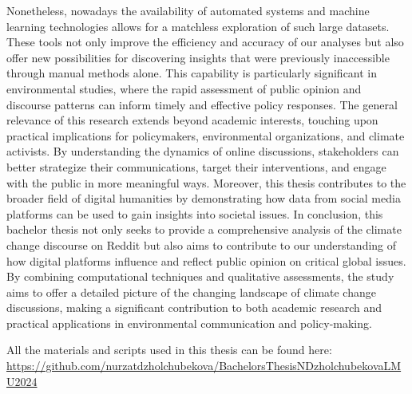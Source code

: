 Nonetheless, nowadays the availability of automated systems and machine learning technologies allows for a 
matchless exploration of such large datasets. These tools not only improve the efficiency and 
accuracy of our analyses but also offer new possibilities for discovering insights that were previously 
inaccessible through manual methods alone. This capability is particularly significant in environmental 
studies, where the rapid assessment of public opinion and discourse patterns can inform timely and 
effective policy responses.
The general relevance of this research extends beyond academic interests, touching upon practical 
implications for policymakers, environmental organizations, and climate activists. By understanding 
the dynamics of online discussions, stakeholders can better strategize their communications, target 
their interventions, and engage with the public in more meaningful ways. Moreover, this thesis 
contributes to the broader field of digital humanities by demonstrating how data from social media 
platforms can be used to gain insights into societal issues.
In conclusion, this bachelor thesis not only seeks to provide a comprehensive analysis of the climate 
change discourse on Reddit but also aims to contribute to our understanding of how digital platforms 
influence and reflect public opinion on critical global issues. By combining computational 
techniques and qualitative assessments, the study aims to offer a detailed picture of the 
changing landscape of climate change discussions, making a significant contribution to both academic 
research and practical applications in environmental communication and policy-making.

\vspace{1em}

All the materials and scripts used in this thesis can be found here:
\url{https://github.com/nurzatdzholchubekova/BachelorsThesisNDzholchubekovaLMU2024}